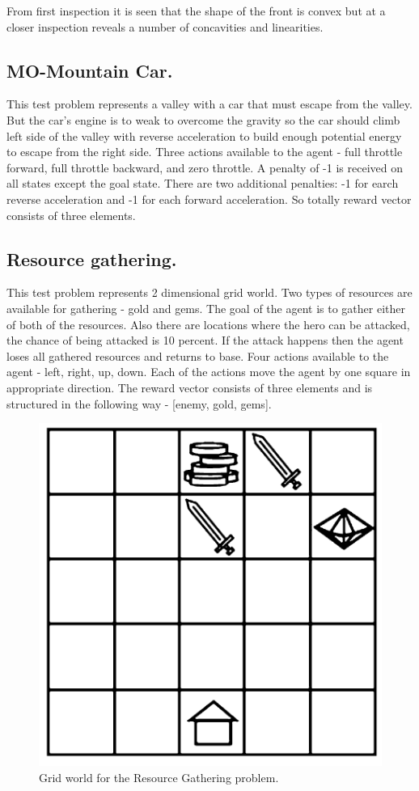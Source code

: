 From first inspection it is seen that the shape of the front is convex but at a closer inspection reveals a number of concavities and linearities. \\


\subsection{MO-Mountain Car.}
This test problem represents a valley with a car that must escape from the valley. But the car's engine is to weak to overcome the gravity so the car should climb left side of the valley with reverse acceleration to build enough potential energy to escape from the right side. Three actions available to the agent - full
throttle forward, full throttle backward, and zero throttle. A penalty of -1 is received on all states except the goal state. There are two additional penalties: -1 for earch reverse acceleration and -1 for each forward acceleration. So totally reward vector consists of three elements. \\

\subsection{Resource gathering.}
This test problem represents 2 dimensional grid world. Two types of resources are available for gathering - gold and gems. The goal of the agent is to gather either of both of the resources. Also there are locations where the hero can be attacked, the chance of being attacked is 10 percent. If the attack happens then the agent loses all gathered resources and returns to base. Four actions available to the agent - left, right, up, down. Each of the actions move the agent by one square in appropriate direction. The reward vector consists of three elements and is structured in the following way - [enemy, gold, gems]. \\
\begin{figure}[ht]
\vskip 0.2in
\centering
\includegraphics[scale=0.6]{rg.png}
\caption{Grid world for the Resource Gathering problem.}
\label{ParetoDominance}
\end{figure}

